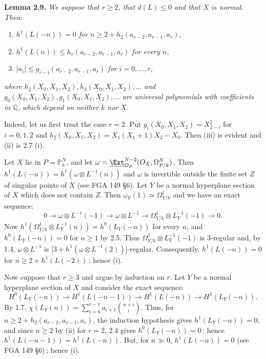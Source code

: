 \textbf{Lemma 2.9.} \emph{We suppose that \(r\ge2\), that \(d(L)\le0\) and that \(X\) is normal. Then}:
\begin{enumerate}[label=(\roman*)]
\item \emph{\(h^1(L(-n))=0\) for \(n\ge2+h_2(a_{r-2},a_{r-1},a_r)\),}
\item \emph{\(h^1(L(n))\le h_r(a_{r-2},a_{r-1},a_r)\) for every \(n\),}
\item \emph{\(|a_i|\le g_{r-i}(a_{r-2},a_{r-1},a_r)\) for \(i=0,\ldots,r\),}
\end{enumerate}
\emph{where \(h_2(X_0,X_1,X_2),h_3(X_0,X_1,X_2),\ldots\) and \(g_0(X_0,X_1,X_2),g_1(X_0,X_1,X_2),\ldots\) are universal polynomials with coefficients in \(\mathbb Q\), which depend on neither \(k\) nor \(X\).}

%
Indeed, let us first treat the case \(r=2\). Put \(g_i(X_0,X_1,X_2)=X_{2-i}^2\) for \(i=0,1,2\) and \(h_2(X_0,X_1,X_2)=X_1(X_1+1)X_2-X_0\). Then (iii) is evident and (ii) is 2.7 (i).

Let \(X\) lie in \(P=\mathbb P_k^N\), and let \(\omega=\underline{\Ext}^{N-2}_{{O}_P}({O}_X,\Omega^N_{P/k})\). Then \(h^1(L(-n))=h^1(\omega\otimes L^{-1}(n))\) and \(\omega\) is invertible outside the finite set \(Z\) of singular points of \(X\) (see FGA 149 \S 6). Let \(Y\) be a normal hyperplane section of \(X\) which does not contain \(Z\). Then \(\omega_Y(1)\simeq\Omega^1_{Y/k}\) and we have an exact sequence:
\[
0\longrightarrow \omega\otimes L^{-1}(-1)
\longrightarrow \omega\otimes L^{-1}
\longrightarrow \Omega^1_{Y/k}\otimes L_Y^{-1}(-1)
\longrightarrow0.
\]
Now \(h^1(\Omega^1_{Y/k}\otimes L_Y^{-1}(n))=h^0(L_Y(-n))\) for every \(n\), and \(h^0(L_Y(-n))=0\) for \(n\ge1\) by 2.5. Thus \(\Omega^1_{Y/k}\otimes L_Y^{-1}(-1)\) is 3-regular and, by 1.4, \(\omega\otimes L^{-1}\) is \(\bigl[3+h^1(\omega\otimes L^{-1}(2))\bigr]\)-regular. Consequently, \(h^1(L(-n))=0\) for \(n\ge2+h^1(L(-2))\)\,; hence (i).

Now suppose that \(r\ge3\) and argue by induction on \(r\). Let \(Y\) be a normal hyperplane section of \(X\) and consider the exact sequence:
\[
H^0(L_Y(-n))\longrightarrow H^1(L(-n-1))
\longrightarrow H^1(L(-n))\longrightarrow H^1(L_Y(-n)).
\tag{2.9.1}
\]
By 1.7, \(\chi(L_Y(n))=\sum_{i=0}^{r-1}a_{i+1}\binom{n+i}{i}\). Thus, for \(n\ge2+h_2(a_{r-2},a_{r-1},a_r)\), the induction hypothesis gives \(h^1(L_Y(-n))=0\), and since \(n\ge2\) by (ii) for \(r=2\), 2.4 gives \(h^0(L_Y(-n))=0\)\,; hence \(h^1(L(-n-1))=h^1(L(-n))\). But, for \(n\gg0\), \(h^1(L(-n))=0\) (see FGA 149 \S 6)\,; hence (i).

